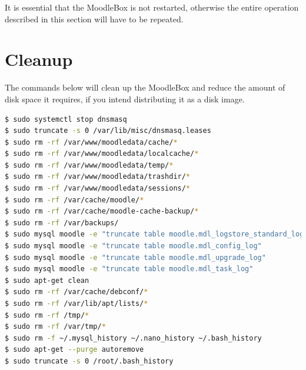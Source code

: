 \documentclass[12pt]{article}
\begin{document}
It is essential that the MoodleBox is not restarted, otherwise the entire operation described in this section will have to be repeated.

\section{Cleanup}

The commands below will clean up the MoodleBox and reduce the amount of disk space it requires, if you intend distributing it as a disk image.

\begin{lstlisting}[language=bash]
$ sudo systemctl stop dnsmasq
$ sudo truncate -s 0 /var/lib/misc/dnsmasq.leases
$ sudo rm -rf /var/www/moodledata/cache/*
$ sudo rm -rf /var/www/moodledata/localcache/*
$ sudo rm -rf /var/www/moodledata/temp/*
$ sudo rm -rf /var/www/moodledata/trashdir/*
$ sudo rm -rf /var/www/moodledata/sessions/*
$ sudo rm -rf /var/cache/moodle/*
$ sudo rm -rf /var/cache/moodle-cache-backup/*
$ sudo rm -rf /var/backups/
$ sudo mysql moodle -e "truncate table moodle.mdl_logstore_standard_log"
$ sudo mysql moodle -e "truncate table moodle.mdl_config_log"
$ sudo mysql moodle -e "truncate table moodle.mdl_upgrade_log"
$ sudo mysql moodle -e "truncate table moodle.mdl_task_log"
$ sudo apt-get clean
$ sudo rm -rf /var/cache/debconf/*
$ sudo rm -rf /var/lib/apt/lists/*
$ sudo rm -rf /tmp/*
$ sudo rm -rf /var/tmp/*
$ sudo rm -f ~/.mysql_history ~/.nano_history ~/.bash_history
$ sudo apt-get --purge autoremove
$ sudo truncate -s 0 /root/.bash_history
\end{lstlisting}
\end{document}
